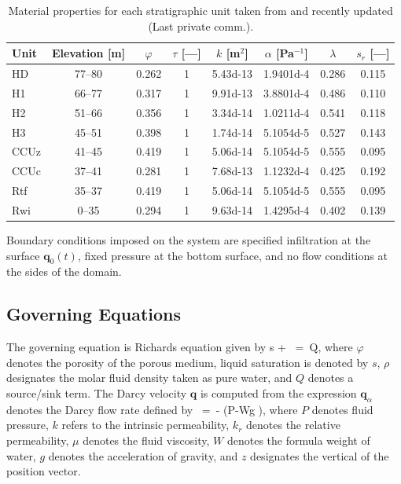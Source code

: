 \documentclass[12pt]{article}
\def\EQ#1\EN{\begin{equation}#1\end{equation}}
\newcommand{\eq}{\ =\ }
\newcommand{\p}{{\partial}}
\renewcommand{\a}{{\alpha}}
\newcommand{\bnabla}{\boldsymbol{\nabla}}
\newcommand{\bq}{\boldsymbol{q}}
\newcommand{\bz}{\boldsymbol{z}}
\begin{document}
\begin{table}[h]\centering
\caption{Material properties for each stratigraphic unit taken from \cite{last09} and recently updated (Last private comm.).}\label{tstrata}
\vspace{3mm}
\begin{tabular}{lccccccc}
\toprule
Unit & Elevation [m] & $\varphi$ & $\tau$ [---] & $k$ [m$^2$] & $\a$ [Pa$^{-1}$] & $\lambda$ & $s_r$ [---] \\
\midrule
HD   & 77--80 & 0.262 & 1 & 5.43d-13 & 1.9401d-4 & 0.286 & 0.115 \\ 
H1   & 66--77 & 0.317 & 1 & 9.91d-13 & 3.8801d-4 & 0.486 & 0.110\\
H2   & 51--66 & 0.356 & 1 & 3.34d-14 & 1.0211d-4 & 0.541 & 0.118\\
H3   & 45--51 & 0.398 & 1 & 1.74d-14 & 5.1054d-5 & 0.527 & 0.143\\
CCUz & 41--45 & 0.419 & 1 & 5.06d-14 & 5.1054d-5 & 0.555 & 0.095\\
CCUc & 37--41 & 0.281 & 1 & 7.68d-13 & 1.1232d-4 & 0.425 & 0.192\\
Rtf  & 35--37 & 0.419 & 1 & 5.06d-14 & 5.1054d-5 & 0.555 & 0.095\\
Rwi  & 0--35 & 0.294 & 1 & 9.63d-14 & 1.4295d-4 & 0.402 & 0.139\\
\bottomrule
\end{tabular}
\end{table}

Boundary conditions imposed on the system are specified infiltration at the surface $\bq_0(t)$, fixed pressure at the bottom surface, and no flow conditions at the sides of the domain.

\subsection{Governing Equations}

The governing equation is Richards equation given by
\EQ
\frac{\p}{\p t} \varphi s \rho + \bnabla\cdot\bq\rho \eq Q,
\EN
where $\varphi$ denotes the porosity of the porous medium, liquid saturation is denoted by $s$, $\rho$ designates the molar fluid density taken as pure water, and $Q$ denotes a source/sink term. The Darcy velocity $\bq$ is computed from the expression
$\bq_\a$ denotes the Darcy flow rate defined by
\EQ
\bq \eq - \bnabla \big(P-W\rho g \bz\big),
\EN
where $P$ denotes fluid pressure, $k$ refers to the intrinsic permeability, $k_r$ denotes the relative permeability, $\mu$ denotes the fluid viscosity, $W$ denotes the formula weight of water, $g$ denotes the acceleration of gravity, and $z$ designates the vertical of the position vector. 
\end{document}
